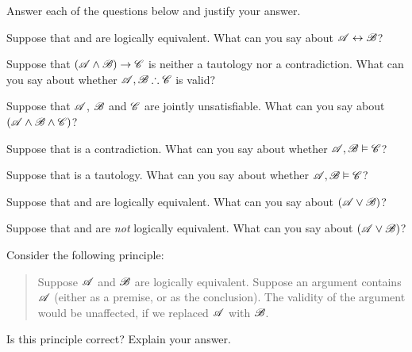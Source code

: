 \solutions
\problempart
\label{pr.TT.concepts}
Answer each of the questions below and justify your answer.
\begin{compactlist}
\item Suppose that  and  are logically equivalent. What can you say about $\mathscr{A}\leftrightarrow\mathscr{B}$?
\item Suppose that $(\mathscr{A}\wedge\mathscr{B})\rightarrow\mathscr{C}$ is neither a tautology nor a contradiction. What can you say about whether $\metav{A}, \metav{B} \therefore\metav{C}$ is valid?
\item Suppose that $\mathscr{A}$, $\mathscr{B}$ and $\mathscr{C}$  are jointly unsatisfiable. What can you say about $(\mathscr{A}\wedge\mathscr{B}\wedge\mathscr{C})$?
\item Suppose that  is a contradiction. What can you say about whether $\mathscr{A}, \mathscr{B} \vDash \mathscr{C}$?
\item Suppose that  is a tautology. What can you say about whether $\mathscr{A}, \mathscr{B}\vDash \mathscr{C}$?
\item Suppose that  and  are logically equivalent. What can you say about $(\mathscr{A}\vee\mathscr{B})$?
\item Suppose that  and  are \emph{not} logically equivalent. What can you say about $(\mathscr{A}\vee\mathscr{B})$?
\end{compactlist}
\problempart 
Consider the following principle:
	\begin{quote}
		Suppose $\mathscr{A}$ and $\mathscr{B}$ are logically equivalent. Suppose an argument contains $\mathscr{A}$ (either as a premise, or as the conclusion). The validity of the argument would be unaffected, if we replaced $\mathscr{A}$ with $\mathscr{B}$.
	\end{quote}
Is this principle correct? Explain your answer.

